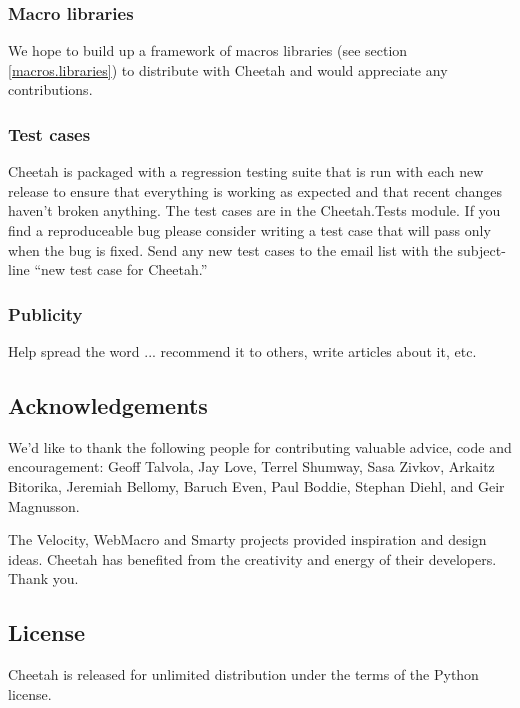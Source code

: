 \subsubsection{Macro libraries}
We hope to build up a framework of macros libraries (see section
\ref{macros.libraries}) to distribute with Cheetah and would appreciate
any contributions.

\subsubsection{Test cases}
Cheetah is packaged with a regression testing suite that is run with each
new release to ensure that everything is working as expected and that recent
changes haven't broken anything.  The test cases are in the Cheetah.Tests
module.  If you find a reproduceable bug please consider writing a test case
that will pass only when the bug is fixed.  Send any new test cases to the email
list with the subject-line ``new test case for Cheetah.''

\subsubsection{Publicity}
Help spread the word ... recommend it to others, write articles about it, etc.

\subsection{Acknowledgements}
\label{intro.acknowledgments}
    
We'd like to thank the following people for contributing valuable advice, code
and encouragement: Geoff Talvola, Jay Love, Terrel Shumway, Sasa Zivkov, Arkaitz
Bitorika, Jeremiah Bellomy, Baruch Even, Paul Boddie, Stephan Diehl, and Geir
Magnusson.
    
The Velocity, WebMacro and Smarty projects provided inspiration and design
ideas.  Cheetah has benefited from the creativity and energy of their
developers. Thank you.

\subsection{License}
\label{intro.license}

Cheetah is released for unlimited distribution under the terms of the
Python license.

